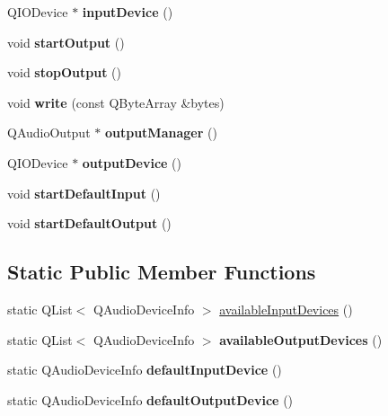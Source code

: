 \begin{DoxyCompactItemize}
\mbox{\label{class_q_qt_audio_manager_aa47bf607aeac9416151e12d08784a0b9}} 
Q\+I\+O\+Device $\ast$ {\bfseries input\+Device} ()
\item 
\mbox{\label{class_q_qt_audio_manager_a094ba272d6a680bf2343b6b496ae1e8d}} 
void {\bfseries start\+Output} ()
\item 
\mbox{\label{class_q_qt_audio_manager_a603296c1b269fde726488c19af28c9b3}} 
void {\bfseries stop\+Output} ()
\item 
\mbox{\label{class_q_qt_audio_manager_a9f3fdf8ee9f60f4838979f1c85d7a60e}} 
void {\bfseries write} (const Q\+Byte\+Array \&bytes)
\item 
\mbox{\label{class_q_qt_audio_manager_ab3546966142d768cb01af5054ace2133}} 
Q\+Audio\+Output $\ast$ {\bfseries output\+Manager} ()
\item 
\mbox{\label{class_q_qt_audio_manager_af96dccce590726bd4fc5517fe7b68d62}} 
Q\+I\+O\+Device $\ast$ {\bfseries output\+Device} ()
\item 
\mbox{\label{class_q_qt_audio_manager_a4d6f5f8d5d8f5ee9b32fdd920cea9b3b}} 
void {\bfseries start\+Default\+Input} ()
\item 
\mbox{\label{class_q_qt_audio_manager_a51eeafdae59df60e3fbf04c1a0045636}} 
void {\bfseries start\+Default\+Output} ()
\end{DoxyCompactItemize}
\subsection*{Static Public Member Functions}
\begin{DoxyCompactItemize}
\item 
static Q\+List$<$ Q\+Audio\+Device\+Info $>$ \mbox{\hyperlink{class_q_qt_audio_manager_a6551c9d1d11f95a1be7b4c87dce763cb}{available\+Input\+Devices}} ()
\item 
\mbox{\label{class_q_qt_audio_manager_ae124fe0847c7d99a4f744bdf71b2c00e}} 
static Q\+List$<$ Q\+Audio\+Device\+Info $>$ {\bfseries available\+Output\+Devices} ()
\item 
\mbox{\label{class_q_qt_audio_manager_a75353f93b00230f6415cc58cf49a20a3}} 
static Q\+Audio\+Device\+Info {\bfseries default\+Input\+Device} ()
\item 
\mbox{\label{class_q_qt_audio_manager_a02794494d00c892b990d693ff80a66a3}} 
static Q\+Audio\+Device\+Info {\bfseries default\+Output\+Device} ()
\end{DoxyCompactItemize}


